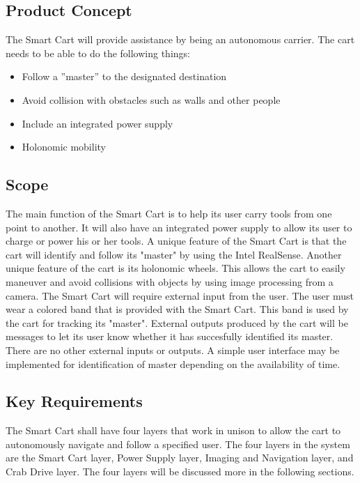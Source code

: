 \subsection{Product Concept}
The Smart Cart will provide assistance by being an autonomous carrier. The cart needs to be able to do the following things:
\begin{itemize}
	\item Follow a ''master'' to the designated destination
	\item Avoid collision with obstacles such as walls and other people
	\item Include an integrated power supply
	\item Holonomic mobility
\end{itemize}

\subsection{Scope}
The main function of the Smart Cart is to help its user carry tools from one point to another. It will also have an integrated power supply to allow its user to charge or power his or her tools. A unique feature of the Smart Cart is that the cart will identify and follow its "master" by using the Intel RealSense. Another unique feature of the cart is its holonomic wheels. This allows the cart to easily maneuver and avoid collisions with objects by using image processing from a camera. The Smart Cart will require external input from the user. The user must wear a colored band that is provided with the Smart Cart. This band is used by the cart for tracking its "master". External outputs produced by the cart will be messages to let its user know whether it has succesfully identified its master. There are no other external inputs or outputs. A simple user interface may be implemented for identification of master depending on the availability of time. 

\subsection{Key Requirements}
The Smart Cart shall have four layers that work in unison to allow the cart to autonomously navigate and follow a specified user. The four layers in the system are the Smart Cart layer, Power Supply layer, Imaging and Navigation layer, and Crab Drive layer. The four layers will be discussed more in the following sections.
